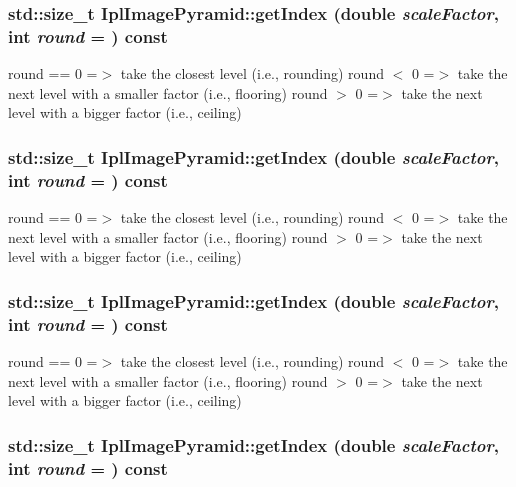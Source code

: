 \hypertarget{class_ipl_image_pyramid_a079949237facf732d588900b143ed3d6}{
\subsubsection[{getIndex}]{\setlength{\rightskip}{0pt plus 5cm}std::size\_\-t IplImagePyramid::getIndex (double {\em scaleFactor}, \/  int {\em round} = {}) const}}
\label{class_ipl_image_pyramid_a079949237facf732d588900b143ed3d6}
round == 0 =$>$ take the closest level (i.e., rounding) round $<$ 0 =$>$ take the next level with a smaller factor (i.e., flooring) round $>$ 0 =$>$ take the next level with a bigger factor (i.e., ceiling) \hypertarget{class_ipl_image_pyramid_a079949237facf732d588900b143ed3d6}{
\subsubsection[{getIndex}]{\setlength{\rightskip}{0pt plus 5cm}std::size\_\-t IplImagePyramid::getIndex (double {\em scaleFactor}, \/  int {\em round} = {}) const}}
\label{class_ipl_image_pyramid_a079949237facf732d588900b143ed3d6}
round == 0 =$>$ take the closest level (i.e., rounding) round $<$ 0 =$>$ take the next level with a smaller factor (i.e., flooring) round $>$ 0 =$>$ take the next level with a bigger factor (i.e., ceiling) \hypertarget{class_ipl_image_pyramid_a079949237facf732d588900b143ed3d6}{
\subsubsection[{getIndex}]{\setlength{\rightskip}{0pt plus 5cm}std::size\_\-t IplImagePyramid::getIndex (double {\em scaleFactor}, \/  int {\em round} = {}) const}}
\label{class_ipl_image_pyramid_a079949237facf732d588900b143ed3d6}
round == 0 =$>$ take the closest level (i.e., rounding) round $<$ 0 =$>$ take the next level with a smaller factor (i.e., flooring) round $>$ 0 =$>$ take the next level with a bigger factor (i.e., ceiling) \hypertarget{class_ipl_image_pyramid_a079949237facf732d588900b143ed3d6}{
\subsubsection[{getIndex}]{\setlength{\rightskip}{0pt plus 5cm}std::size\_\-t IplImagePyramid::getIndex (double {\em scaleFactor}, \/  int {\em round} = {}) const}}
